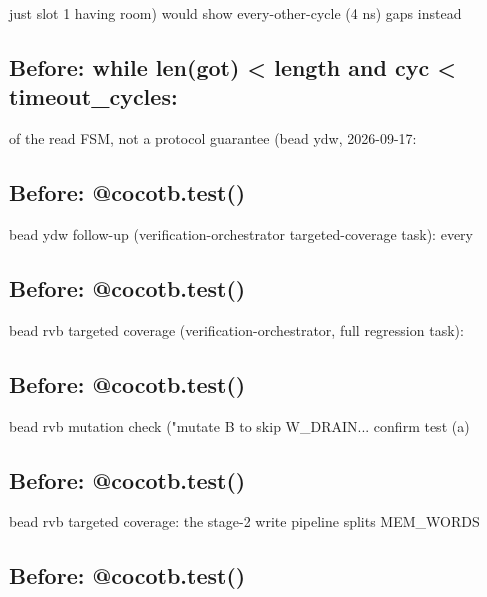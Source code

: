 \begin{record}
\begin{textblock}
just slot 1 having room) would show every-other-cycle (4 ns) gaps instead
\end{textblock}

\subsection*{Before: while len(got) < length and cyc < timeout\_cycles:}

\begin{textblock}
of the read FSM, not a protocol guarantee (bead ydw, 2026-09-17:
\end{textblock}

\subsection*{Before: @cocotb.test()}

\begin{textblock}
bead ydw follow-up (verification-orchestrator targeted-coverage task): every
\end{textblock}

\subsection*{Before: @cocotb.test()}

\begin{textblock}
bead rvb targeted coverage (verification-orchestrator, full regression task):
\end{textblock}

\subsection*{Before: @cocotb.test()}

\begin{textblock}
    bead rvb mutation check ("mutate B to skip W_DRAIN... confirm test (a)
\end{textblock}

\subsection*{Before: @cocotb.test()}

\begin{textblock}
bead rvb targeted coverage: the stage-2 write pipeline splits MEM_WORDS
\end{textblock}

\subsection*{Before: @cocotb.test()}


\end{record}
